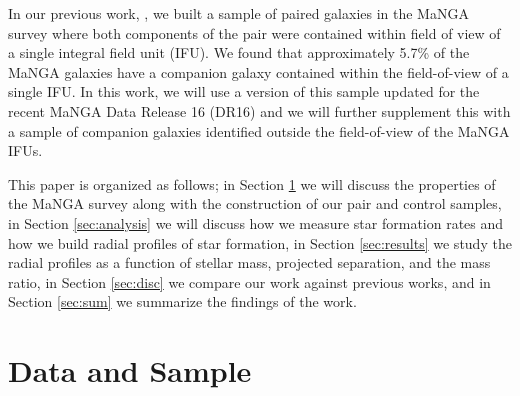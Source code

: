 \documentclass[iop,revtex4,twocolumn,apj,numberedappendix,appendixfloats]{emulateapj}
\begin{document}
In our previous work, \citet{Fu:2018}, we built a sample of paired galaxies in the MaNGA survey where both components of the pair were contained within field of view of a single integral field unit (IFU). We found that approximately 5.7\% of the MaNGA galaxies have a companion galaxy contained within the field-of-view of a single IFU. In this work, we will use a version of this sample updated for the recent MaNGA Data Release 16 (DR16) \citep{Ahumada:2020} and we will further supplement this with a sample of companion galaxies identified outside the field-of-view of the MaNGA IFUs. 

This paper is organized as follows; in Section \ref{sec:data} we will discuss the properties of the MaNGA survey along with the construction of our pair and control samples, in Section \ref{sec:analysis} we will discuss how we measure star formation rates and how we build radial profiles of star formation, in Section \ref{sec:results} we study the radial profiles as a function of stellar mass, projected separation, and the mass ratio, in Section \ref{sec:disc} we compare our work against previous works, and in Section \ref{sec:sum} we summarize the findings of the work. 

\section{Data and Sample}\label{sec:data}
\end{document}
